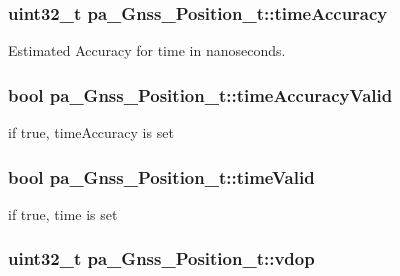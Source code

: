 \subsubsection[{\texorpdfstring{time\+Accuracy}{timeAccuracy}}]{\setlength{\rightskip}{0pt plus 5cm}uint32\+\_\+t pa\+\_\+\+Gnss\+\_\+\+Position\+\_\+t\+::time\+Accuracy}\hypertarget{structpa___gnss___position__t_ad142b2e6733d0b0df6683b38dda4911e}{}\label{structpa___gnss___position__t_ad142b2e6733d0b0df6683b38dda4911e}


Estimated Accuracy for time in nanoseconds. 

\subsubsection[{\texorpdfstring{time\+Accuracy\+Valid}{timeAccuracyValid}}]{\setlength{\rightskip}{0pt plus 5cm}bool pa\+\_\+\+Gnss\+\_\+\+Position\+\_\+t\+::time\+Accuracy\+Valid}\hypertarget{structpa___gnss___position__t_a766f04eee679c54c9a0879790af9e091}{}\label{structpa___gnss___position__t_a766f04eee679c54c9a0879790af9e091}


if true, time\+Accuracy is set 

\subsubsection[{\texorpdfstring{time\+Valid}{timeValid}}]{\setlength{\rightskip}{0pt plus 5cm}bool pa\+\_\+\+Gnss\+\_\+\+Position\+\_\+t\+::time\+Valid}\hypertarget{structpa___gnss___position__t_a0707a2b4e8cf2148086098e7a3fa1b9f}{}\label{structpa___gnss___position__t_a0707a2b4e8cf2148086098e7a3fa1b9f}


if true, time is set 

\subsubsection[{\texorpdfstring{vdop}{vdop}}]{\setlength{\rightskip}{0pt plus 5cm}uint32\+\_\+t pa\+\_\+\+Gnss\+\_\+\+Position\+\_\+t\+::vdop}\hypertarget{structpa___gnss___position__t_a35451034d0b82b8e0f0f40a8b412976e}{}\label{structpa___gnss___position__t_a35451034d0b82b8e0f0f40a8b412976e}


